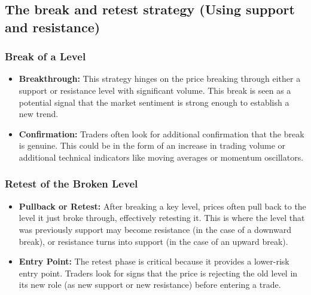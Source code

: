 \documentclass{report}
\begin{document}
    \bigbreak \noindent 

    \bigbreak \noindent 
    \subsection{The break and retest strategy (Using support and resistance)}
    \bigbreak \noindent 
    \subsubsection{Break of a Level}
    \bigbreak \noindent 
    \begin{itemize}
        \item \textbf{Breakthrough:} This strategy hinges on the price breaking through either a support or resistance level with significant volume. This break is seen as a potential signal that the market sentiment is strong enough to establish a new trend.
        \item \textbf{Confirmation:} Traders often look for additional confirmation that the break is genuine. This could be in the form of an increase in trading volume or additional technical indicators like moving averages or momentum oscillators.
    \end{itemize}
    \bigbreak \noindent 
    \subsubsection{Retest of the Broken Level}
    \bigbreak \noindent 
    \begin{itemize}
        \item \textbf{Pullback or Retest:} After breaking a key level, prices often pull back to the level it just broke through, effectively retesting it. This is where the level that was previously support may become resistance (in the case of a downward break), or resistance turns into support (in the case of an upward break).
        \item \textbf{Entry Point:} The retest phase is critical because it provides a lower-risk entry point. Traders look for signs that the price is rejecting the old level in its new role (as new support or new resistance) before entering a trade.
    \end{itemize}
    \bigbreak \noindent 
\end{document}
